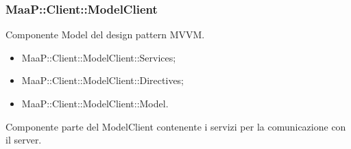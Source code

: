 \subsubsection{MaaP::Client::ModelClient}
Componente Model del design pattern MVVM.
\begin{itemize}
\item MaaP::Client::ModelClient::Services;
\item MaaP::Client::ModelClient::Directives;
\item MaaP::Client::ModelClient::Model.
\end{itemize}

Componente parte del ModelClient contenente i servizi per la comunicazione con il server.

